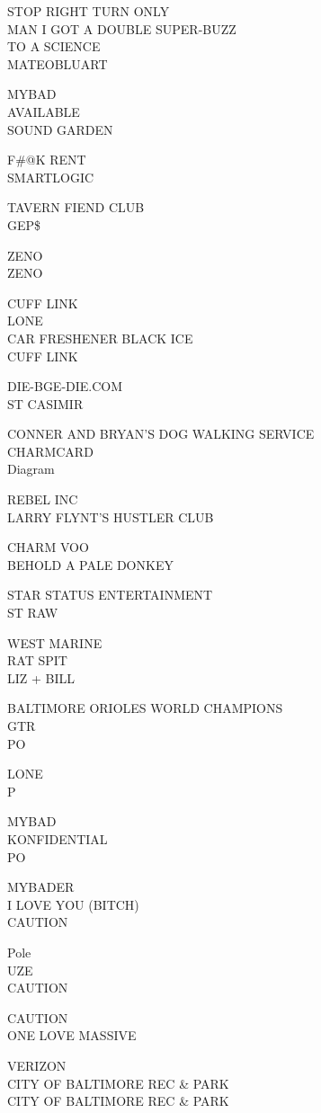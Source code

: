\documentclass[10pt,letterpaper]{article}
\begin{document}
STOP RIGHT TURN ONLY\\
MAN I GOT A DOUBLE SUPER{-}BUZZ\\
TO A SCIENCE\\
MATEOBLUART

MYBAD\\
AVAILABLE\\
SOUND GARDEN

F\#@K RENT\\
SMARTLOGIC

TAVERN FIEND CLUB\\
GEP\$

ZENO\\
ZENO

CUFF LINK\\
LONE\\
CAR FRESHENER BLACK ICE\\
CUFF LINK

DIE{-}BGE{-}DIE.COM\\
ST CASIMIR

CONNER AND BRYAN'S DOG WALKING SERVICE\\
CHARMCARD\\
Diagram

REBEL INC\\
LARRY FLYNT'S HUSTLER CLUB

CHARM VOO\\
BEHOLD A PALE DONKEY

STAR STATUS ENTERTAINMENT\\
ST RAW

WEST MARINE\\
RAT SPIT\\
LIZ + BILL

BALTIMORE ORIOLES WORLD CHAMPIONS\\
GTR\\
PO

LONE\\
P

MYBAD\\
KONFIDENTIAL\\
PO

MYBADER\\
I LOVE YOU (BITCH)\\
CAUTION

Pole\\
UZE\\
CAUTION

CAUTION\\
ONE LOVE MASSIVE

VERIZON\\
CITY OF BALTIMORE REC \& PARK\\
CITY OF BALTIMORE REC \& PARK
\end{document}
